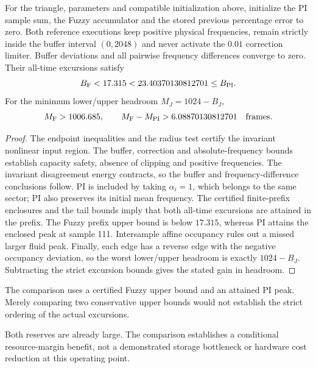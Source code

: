 \begin{btdtheorem}
\label{thm:btd_headroom}
For the triangle, parameters and compatible initialization above,
initialize the PI sample sum, the Fuzzy accumulator and the stored
previous percentage error to zero. Both reference executions keep
positive physical frequencies, remain strictly inside the buffer
interval $(0,2048)$ and never activate the $0.01$ correction limiter.
Buffer deviations and all pairwise frequency differences converge to
zero. Their all-time excursions satisfy
\begin{equation}
 B_{\rm F}<17.315<23.40370130812701\le B_{\rm PI}.
 \label{eq:btd_strict_comparison}
\end{equation}
For the minimum lower/upper headroom $M_J=1024-B_J$,
\begin{equation}
 M_{\rm F}>1006.685,\qquad
 M_{\rm F}-M_{\rm PI}>6.08870130812701\quad\text{frames}.
 \label{eq:btd_margin_improvement}
\end{equation}
\end{btdtheorem}
\begin{proof}
The endpoint inequalities and the radius test certify the invariant
nonlinear input region. The buffer, correction and absolute-frequency
bounds establish capacity safety, absence of clipping and positive
frequencies. The invariant disagreement energy contracts, so the buffer
and frequency-difference conclusions follow. PI is included by taking
$\alpha_i=1$, which belongs to the same sector; PI also preserves its
initial mean frequency. The certified finite-prefix enclosures and the
tail bounds imply that both all-time excursions are attained in the
prefix. The Fuzzy prefix upper bound is below $17.315$, whereas PI
attains the enclosed peak at sample 111. Intersample affine occupancy
rules out a missed larger fluid peak. Finally, each edge has a reverse
edge with the negative occupancy deviation, so the worst lower/upper
headroom is exactly $1024-B_J$. Subtracting the strict excursion bounds
gives the stated gain in headroom.
\end{proof}

The comparison uses a certified Fuzzy upper bound and an attained PI
peak. Merely comparing two conservative upper bounds would not establish
the strict ordering of the actual excursions.

Both reserves are already large. The comparison establishes a conditional
resource-margin benefit, not a demonstrated storage bottleneck or hardware
cost reduction at this operating point.

